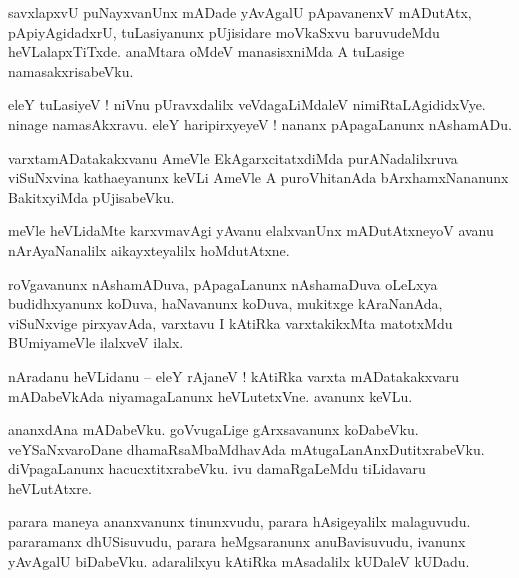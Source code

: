 \documentclass{article}
\begin{document}
\begin{mn}%
savxlapxvU puNayxvanUnx mADade yAvAgalU pApavanenxV mADutAtx, pApiyAgidadxrU, tuLasiyanunx 
pUjisidare moVkaSxvu baruvudeMdu heVLalapxTiTxde. anaMtara oMdeV manasisxniMda A tuLasige 
namasakxrisabeVku.
\end{mn}

\begin{mn}%
eleY tuLasiyeV ! niVnu pUravxdalilx veVdagaLiMdaleV nimiRtaLAgididxVye. ninage namasAkxravu. eleY 
haripirxyeyeV ! nananx pApagaLanunx nAshamADu.
\end{mn}

\begin{mn}%
varxtamADatakakxvanu AmeVle EkAgarxcitatxdiMda purANadalilxruva viSuNxvina kathaeyanunx keVLi 
AmeVle A puroVhitanAda bArxhamxNananunx BakitxyiMda pUjisabeVku.
\end{mn}

\begin{mn}%
meVle heVLidaMte karxvmavAgi yAvanu elalxvanUnx mADutAtxneyoV avanu nArAyaNanalilx aikayxteyalilx 
hoMdutAtxne.
\end{mn}

\begin{mn}%
roVgavanunx nAshamADuva, pApagaLanunx nAshamaDuva oLeLxya budidhxyanunx koDuva, haNavanunx koDuva, 
mukitxge kAraNanAda, viSuNxvige pirxyavAda, varxtavu I kAtiRka varxtakikxMta matotxMdu BUmiyameVle 
ilalxveV ilalx.
\end{mn}


\begin{mn}%
nAradanu heVLidanu -- eleY rAjaneV ! kAtiRka varxta mADatakakxvaru mADabeVkAda niyamagaLanunx 
heVLutetxVne. avanunx keVLu. 
\end{mn}

\begin{mn}%
ananxdAna mADabeVku. goVvugaLige gArxsavanunx koDabeVku. veYSaNxvaroDane dhamaRsaMbaMdhavAda 
mAtugaLanAnxDutitxrabeVku. diVpagaLanunx hacucxtitxrabeVku. ivu damaRgaLeMdu tiLidavaru heVLutAtxre.
\end{mn}

\begin{mn}%
parara maneya ananxvanunx tinunxvudu, parara hAsigeyalilx malaguvudu. pararamanx dhUSisuvudu, 
parara heMgsaranunx anuBavisuvudu, ivanunx yAvAgalU biDabeVku. adaralilxyu kAtiRka mAsadalilx 
kUDaleV kUDadu.
\end{mn}
\end{document}
